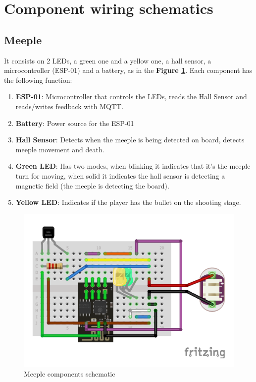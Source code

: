 \documentclass[../main.tex]{subfiles}
\begin{document}
\section{Component wiring schematics}

\subsection{Meeple}

It consists on 2 LEDs, a green one and a yellow one, a hall sensor, a microcontroller (ESP-01) and a battery, as in the \textbf{Figure \ref{fig:meeple}}. Each component has the following function:

\begin{enumerate}
    \item \textbf{ESP-01}: Microcontroller that controls the LEDs, reads the Hall Sensor and reads/writes feedback with MQTT.
    \item \textbf{Battery}: Power source for the ESP-01
    \item \textbf{Hall Sensor}: Detects when the meeple is being detected on board, detects meeple movement and death.
    \item \textbf{Green LED}: Has two modes, when blinking it indicates that it's the meeple turn for moving, when solid it indicates the hall sensor is detecting a magnetic field (the meeple is detecting the board).
    \item \textbf{Yellow LED}: Indicates if the player has the bullet on the shooting stage.
\end{enumerate}

\begin{figure}[!htb]
    \centering
    \includegraphics[width= 0.7\linewidth]{../media/figures/schematic_meeple.pdf}
    \caption{Meeple components schematic}
    \label{fig:meeple}
\end{figure}
\end{document}

